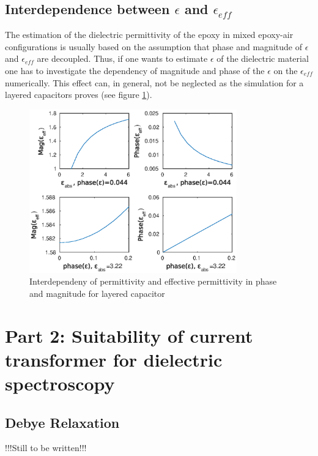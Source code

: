 \subsection{Interdependence between $\epsilon$ and $\epsilon_{eff}$} 
The estimation of the dielectric permittivity of the epoxy in mixed epoxy-air configurations is usually based on the assumption that phase and magnitude of $\epsilon$ and $\epsilon_{eff}$ are decoupled. Thus, if one wants to estimate $\epsilon$ of the dielectric material one has to investigate the dependency of magnitude and phase of the $\epsilon$ on the $\epsilon_{eff}$ numerically. This effect can, in general, not be neglected as the simulation for a layered capacitors proves (see figure \ref{fig.layered}).  
\begin{figure}

	\includegraphics[width=0.8\textwidth]{figures/Theory/layeredepsilon.eps}
	\caption[Kurze Abbildungsbeschreibung]{Interdependeny of permittivity and effective permittivity in phase and magnitude for layered capacitor}
	\label{fig.layered}
\end{figure}
	
	
\section{Part 2: Suitability of current transformer for dielectric spectroscopy}
\subsection{Debye Relaxation}
!!!Still to be written!!!


